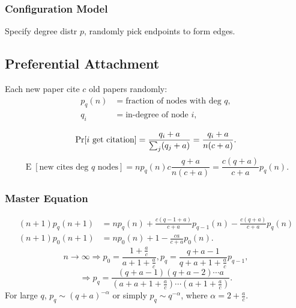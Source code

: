 \documentclass[a4paper,twocolumn,10pt]{article}
\newcommand{\E}{\operatorname{E}}
\begin{document}
	\subsubsection{Configuration Model}
		Specify degree distr $p$, randomly pick endpoints to form edges.

\subsection{Preferential Attachment}
	Each new paper cite $c$ old papers randomly:
	\[ \begin{split}
		p_q(n) &= \textrm{fraction of nodes with deg $q$}, \\
		q_i &= \textrm{in-degree of node $i$}, \\
	\end{split} \]
	\[
		\Pr[i\textrm{ get citation}] = \frac{q_i+a}{\sum_j (q_j+a)} = \frac{q_i+a}{n(c+a)}. \\
	\]
	\[
		\E[\textrm{new cites deg $q$ nodes}]
			=n p_q(n) c \frac{q+a}{n(c+a)} = \frac{c(q+a)}{c+a} p_q(n).
	\]
	\subsubsection{Master Equation}
		\[ \begin{split}
			(n+1)p_q(n+1)&=np_q(n)
				+\frac{c(q-1+a)}{c+a}p_{q-1}(n)- \frac{c(q+a)}{c+a}p_q(n) \\
			(n+1)p_0(n+1)&=np_0(n)+1-\frac{ca}{c+a}p_0(n).
		\end{split} \]
		\[
			n\to\infty\Longrightarrow
			p_0=\frac{1+\frac{a}{c}}{a+1+\frac{a}{c}},
			p_q=\frac{q+a-1}{q+a+1+\frac{a}{c}}p_{q-1},
		\]
		\[
			\Longrightarrow
			p_q=\frac{(q+a-1)(q+a-2)\cdots a}{(a+a+1+\frac{a}{c})\cdots(a+1+\frac{a}{c})}.
		\]
		For large $q$,
			$p_q\sim (q+a)^{-\alpha}$ or simply $p_q\sim q^{-\alpha}$,
			where $\alpha=2+\frac{a}{c}$.
	
\end{document}
